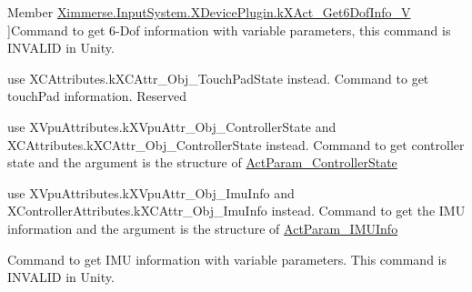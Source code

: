 \begin{DoxyRefList}
Member \mbox{\hyperlink{class_ximmerse_1_1_input_system_1_1_x_device_plugin_ab7f817a86e5b3af956089fb089b7d0c3af7886a71cbe4a4ea23eccc725fbef65a}{Ximmerse.Input\+System.X\+Device\+Plugin.k\+X\+Act\+\_\+\+Get6\+Dof\+Info\+\_\+V}} ]Command to get 6-\/\+Dof information with variable parameters, this command is I\+N\+V\+A\+L\+ID in Unity.  
\item[\label{deprecated__deprecated000030}%
\Hypertarget{deprecated__deprecated000030}%
Member \mbox{\hyperlink{class_ximmerse_1_1_input_system_1_1_x_device_plugin_ab7f817a86e5b3af956089fb089b7d0c3ad857890d1dfdb1a12eb84ddc0440b982}{Ximmerse.Input\+System.X\+Device\+Plugin.k\+X\+Act\+\_\+\+Get\+\_\+\+Touch\+Pad\+State}} ]use X\+C\+Attributes.\+k\+X\+C\+Attr\+\_\+\+Obj\+\_\+\+Touch\+Pad\+State instead. Command to get touch\+Pad information. Reserved  
\item[\label{deprecated__deprecated000034}%
\Hypertarget{deprecated__deprecated000034}%
Member \mbox{\hyperlink{class_ximmerse_1_1_input_system_1_1_x_device_plugin_ab7f817a86e5b3af956089fb089b7d0c3ac6672a3fc9904aa78ca8193b4b3dbc63}{Ximmerse.Input\+System.X\+Device\+Plugin.k\+X\+Act\+\_\+\+Get\+Controller\+State}} ]use X\+Vpu\+Attributes.\+k\+X\+Vpu\+Attr\+\_\+\+Obj\+\_\+\+Controller\+State and X\+C\+Attributes.\+k\+X\+C\+Attr\+\_\+\+Obj\+\_\+\+Controller\+State instead. Command to get controller state and the argument is the structure of \mbox{\hyperlink{struct_ximmerse_1_1_input_system_1_1_x_device_plugin_1_1_act_param___controller_state}{Act\+Param\+\_\+\+Controller\+State}}  
\item[\label{deprecated__deprecated000025}%
\Hypertarget{deprecated__deprecated000025}%
Member \mbox{\hyperlink{class_ximmerse_1_1_input_system_1_1_x_device_plugin_ab7f817a86e5b3af956089fb089b7d0c3a36934a08a9b02748ea0bf23062ec091b}{Ximmerse.Input\+System.X\+Device\+Plugin.k\+X\+Act\+\_\+\+Get\+Imu\+Info}} ]use X\+Vpu\+Attributes.\+k\+X\+Vpu\+Attr\+\_\+\+Obj\+\_\+\+Imu\+Info and X\+Controller\+Attributes.\+k\+X\+C\+Attr\+\_\+\+Obj\+\_\+\+Imu\+Info instead. Command to get the I\+MU information and the argument is the structure of \mbox{\hyperlink{struct_ximmerse_1_1_input_system_1_1_x_device_plugin_1_1_act_param___i_m_u_info}{Act\+Param\+\_\+\+I\+M\+U\+Info}}  
\item[\label{deprecated__deprecated000026}%
\Hypertarget{deprecated__deprecated000026}%
Member \mbox{\hyperlink{class_ximmerse_1_1_input_system_1_1_x_device_plugin_ab7f817a86e5b3af956089fb089b7d0c3a36d3d672e4cc84dd4e937d60397ac38a}{Ximmerse.Input\+System.X\+Device\+Plugin.k\+X\+Act\+\_\+\+Get\+Imu\+Info\+\_\+V}} ]Command to get I\+MU information with variable parameters. This command is I\+N\+V\+A\+L\+ID in Unity.  

\end{DoxyRefList}

